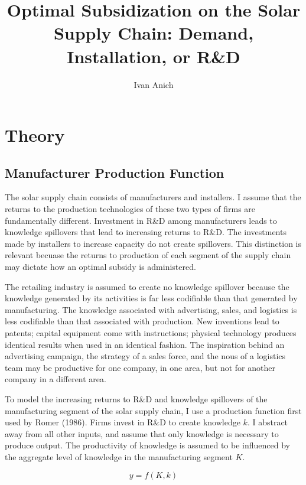 \documentclass{article}
\title{Optimal Subsidization on the Solar Supply Chain: Demand, Installation, or R\&D}
\author{Ivan Anich}
\begin{document}
\maketitle


\section{Theory}

\subsection{Manufacturer Production Function}

The solar supply chain consists of manufacturers and installers. I assume that the returns to the production technologies of these two types of firms are fundamentally different. Investment in R\&D among manufacturers leads to knowledge spillovers that lead to increasing returns to R\&D. The investments made by installers to increase capacity do not create spillovers. This distinction is relevant becuase the returns to production of each segment of the supply chain may dictate how an optimal subsidy is administered.

The retailing industry is assumed to create no knowledge spillover because the knowledge generated by its activities is far less codifiable than that generated by manufacturing. The knowledge associated with advertising, sales, and logistics is less codifiable than that associated with production. New inventions lead to patents; capital equipment come with instructions; physical technology produces identical results when used in an identical fashion. The inspiration behind an advertising campaign, the strategy of a sales force, and the nous of a logistics team may be productive for one company, in one area, but not for another company in a different area.

To model the increasing returns to R\&D and knowledge spillovers of the manufacturing segment of the solar supply chain, I use a production function first used by Romer (1986). Firms invest in R\&D to create knowledge $k$. I abstract away from all other inputs, and assume that only knowledge is necessary to produce output. The productivity of knowledge is assumed to be influenced by the aggregate level of knowledge in the manufacturing segment $K$. 

\begin{equation}
y = f(K,k)
\end{equation}
\end{document}
